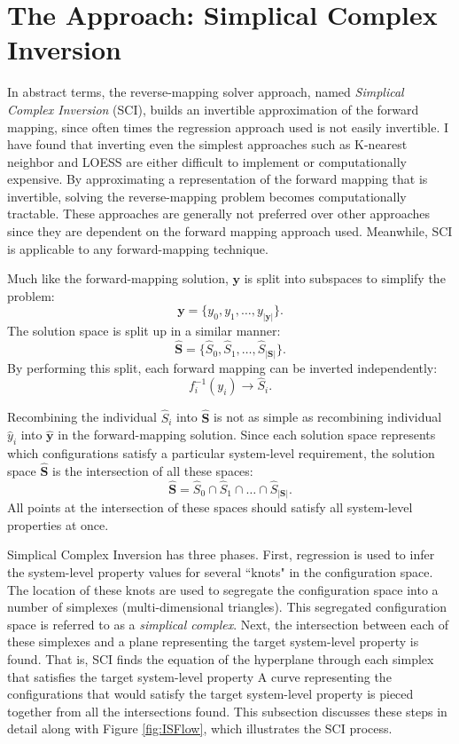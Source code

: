 \section{The \fw Approach: Simplical Complex Inversion}

In abstract terms, the \fw reverse-mapping solver approach, named \textit{Simplical Complex Inversion} (SCI), builds an invertible approximation of the forward mapping, since often times the regression approach used is not easily invertible.
I have found that inverting even the simplest approaches such as K-nearest neighbor and LOESS are either difficult to implement or computationally expensive.
By approximating a representation of the forward mapping that is invertible, solving the reverse-mapping problem becomes computationally tractable.
These approaches are generally not preferred over other approaches since they are dependent on the forward mapping approach used.
Meanwhile, SCI is applicable to any forward-mapping technique.

Much like the forward-mapping solution, $\mathbf y$ is split into subspaces to simplify the problem:
\[ \mathbf y = \{y_0, y_1, \ldots, y_{|\mathbf y|}\}. \]
The solution space is split up in a similar manner:
\[ \hat{\mathbf S} = \{\hat S_0, \hat S_1, \ldots, \hat S_{|\mathbf S|}\}. \]
By performing this split, each forward mapping can be inverted independently:
\[ f^{-1}_i(y_i) \rightarrow \hat S_i. \]

Recombining the individual $\hat S_i$ into $\hat{\mathbf S}$ is not as simple as recombining individual $\hat y_i$ into $\hat{\mathbf y}$ in the forward-mapping solution.
Since each solution space represents which configurations satisfy a particular system-level requirement, the solution space $\hat{\mathbf S}$ is the intersection of all these spaces:
\[ \hat{\mathbf S} = \hat S_0 \cap \hat S_1 \cap \ldots \cap \hat S_{|\mathbf S|}.\]
All points at the intersection of these spaces should satisfy all system-level properties at once.

Simplical Complex Inversion has three phases.
First, regression is used to infer the system-level property values for several ``knots" in the configuration space.
The location of these knots are used to segregate the configuration space into a number of simplexes (multi-dimensional triangles).
This segregated configuration space is referred to as a \textit{simplical complex}.
Next, the intersection between each of these simplexes and a plane representing the target system-level property is found.
That is, SCI finds the equation of the hyperplane through each simplex that satisfies the target system-level property
A curve representing the configurations that would satisfy the target system-level property is pieced together from all the intersections found.
This subsection discusses these steps in detail along with Figure \ref{fig:ISFlow}, which illustrates the SCI process.

